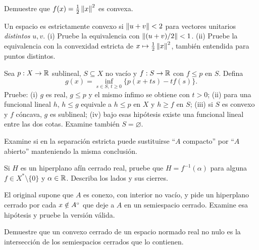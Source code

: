 \begin{ejercicio}\label{ej:v3-l05-2}
Demuestre que $f(x)=\tfrac12\left\lVert x\right\rVert^2$ es convexa.
\end{ejercicio}

\begin{ejercicio}\label{ej:v3-l05-3}
Un espacio es estrictamente convexo si $\left\lVert u+v\right\rVert<2$ para vectores unitarios \emph{distintos} $u,v$. (i) Pruebe la equivalencia con $\left\lVert(u+v)/2\right\rVert<1$. (ii) Pruebe la equivalencia con la convexidad estricta de $x\mapsto\tfrac12\left\lVert x\right\rVert^2$, también entendida para puntos distintos.
\end{ejercicio}


\begin{ejercicio}\label{ej:v3-l05-4}
Sea $p:X\to\mathbb R$ sublineal, $S\subseteq X$ no vacío y $f:S\to\mathbb R$ con $f\leq p$ en $S$. Defina
\[
 g(x)=\inf_{s\in S,\,t\geq0}\{p(x+ts)-tf(s)\}.
\]
Pruebe: (i) $g$ es real, $g\leq p$ y el mismo ínfimo se obtiene con $t>0$; (ii) para una funcional lineal $h$, $h\leq g$ equivale a $h\leq p$ en $X$ y $h\geq f$ en $S$; (iii) si $S$ es convexo y $f$ cóncava, $g$ es sublineal; (iv) bajo esas hipótesis existe una funcional lineal entre las dos cotas. Examine también $S=\varnothing$.
\end{ejercicio}


\begin{ejercicio}\label{ej:v3-l05-5}
Examine si en la separación estricta puede sustituirse ``$A$ compacto'' por ``$A$ abierto'' manteniendo la misma conclusión.
\end{ejercicio}

\begin{ejercicio}\label{ej:v3-l05-6}
Si $H$ es un hiperplano afín cerrado real, pruebe que $H=f^{-1}(\alpha)$ para alguna $f\in X^*\setminus\{0\}$ y $\alpha\in\mathbb R$. Describa los lados y sus cierres.
\end{ejercicio}

\begin{ejercicio}\label{ej:v3-l05-7}
El original supone que $A$ es conexo, con interior no vacío, y pide un hiperplano cerrado por cada $x\notin A^{\circ}$ que deje a $A$ en un semiespacio cerrado. Examine esa hipótesis y pruebe la versión válida.
\end{ejercicio}

\begin{ejercicio}\label{ej:v3-l05-8}
Demuestre que un convexo cerrado de un espacio normado real no nulo es la intersección de los semiespacios cerrados que lo contienen.
\end{ejercicio}


